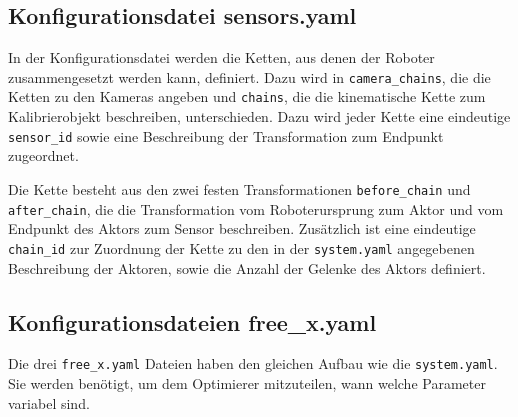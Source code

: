   \subsection{Konfigurationsdatei sensors.yaml} In der Konfigurationsdatei werden die Ketten, aus
    denen der Roboter zusammengesetzt werden kann, definiert. Dazu wird in
    \texttt{camera\_chains}, die die Ketten zu den Kameras angeben und 
    \texttt{chains}, die die kinematische Kette zum Kalibrierobjekt beschreiben,
    unterschieden.
    Dazu wird jeder Kette eine eindeutige \texttt{sensor\_id} sowie eine
    Beschreibung der Transformation zum Endpunkt zugeordnet.
    
    Die Kette besteht aus den zwei festen Transformationen \texttt{before\_chain}
    und \texttt{after\_\allowbreak chain}, die die Transformation vom Roboterursprung zum 
    Aktor und vom Endpunkt des Aktors zum Sensor beschreiben. Zusätzlich ist 
    eine eindeutige \texttt{chain\_id} zur Zuordnung der Kette zu den in der 
    \texttt{system.yaml} angegebenen Beschreibung der Aktoren, sowie die Anzahl
    der Gelenke des Aktors definiert.

  \subsection{Konfigurationsdateien free\_x.yaml} Die drei \texttt{free\_x.yaml} Dateien haben den 
    gleichen Aufbau wie die \texttt{system.yaml}. Sie werden benötigt, um dem 
    Optimierer mitzuteilen, wann welche Parameter variabel sind.


\newpage







%

